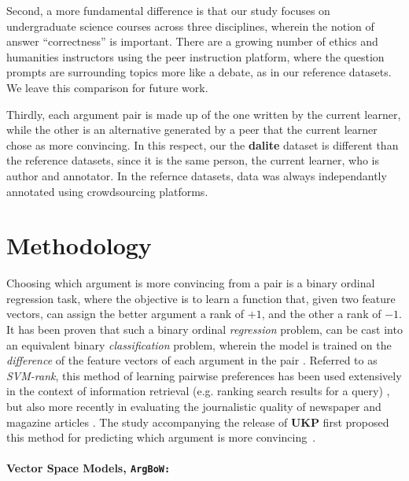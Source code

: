 \documentclass[runningheads]{llncs}
\begin{document}
Second, a more fundamental difference is that our study focuses on 
undergraduate science courses across three disciplines, wherein the notion of 
answer ``correctness'' is important.
There are a growing number of ethics and humanities instructors using the peer 
instruction platform, where the question prompts are surrounding topics more 
like a debate, as in our reference datasets. 
We leave this comparison for future work.

Thirdly, each argument pair is made up of the one written by the current 
learner, while the other is an alternative generated by a peer that the current 
learner chose as more convincing. 
In this respect, our the \textbf{dalite} dataset is different than the 
reference datasets, since it is the same person, the current learner, who is 
author and annotator. In the refernce datasets, data was always independantly 
annotated using crowdsourcing platforms.


\section{Methodology}

Choosing which argument is more convincing from a pair is a binary 
ordinal regression task, where the objective is to learn a function that, given 
two feature vectors, can assign the better argument a rank of $+1$, and the 
other a rank of $-1$.   
It has been proven that such a binary ordinal \textit{regression} problem, can 
be cast into an equivalent binary \textit{classification} problem, wherein the 
model is trained on the \textit{difference} of the feature vectors of each 
argument in the pair \cite{herbrich_support_1999}. 
Referred to as \textit{SVM-rank}, this method of learning pairwise preferences 
has been used extensively in the context of information retrieval (e.g. ranking 
search results for a query) 
\cite{joachims_optimizing_2002}, but also more recently in evaluating the 
journalistic quality of newspaper and magazine articles \cite{louis_what_2013}.
The study accompanying the release of \textbf{UKP} first proposed this method 
for predicting which argument is more convincing~\cite{habernal_which_2016}.

\paragraph{\textbf{Vector Space Models, \tt{ArgBoW}:}}
\end{document}

